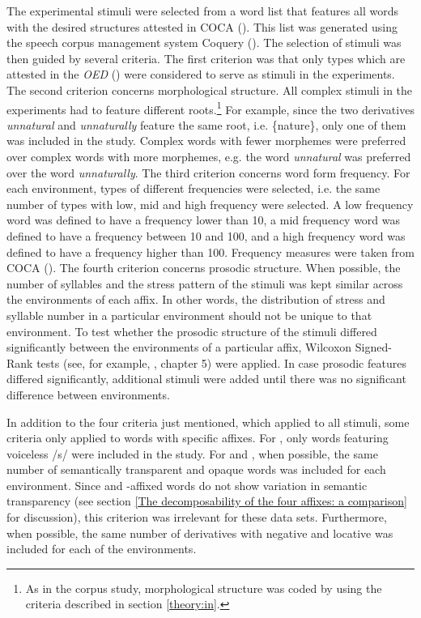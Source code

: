 The experimental stimuli were selected from a word list that features all words with the desired structures attested in COCA (\citealt{Davies.20082014}). This list was generated using the speech corpus management system Coquery (\citealt{Kunter.2016}). The selection of stimuli was then guided by several criteria. 
The first criterion was that only types which are attested in the \textit{OED} (\citealt{OED.2013}) were considered to serve as stimuli in the experiments. 
The second criterion concerns morphological structure. All complex stimuli in the experiments had to feature different roots.\footnote{As in the corpus study, morphological structure was coded by using the criteria described in section \ref{theory:in}.} For example, since the two derivatives \textit{unnatural} and \textit{unnaturally} feature the same root, i.e. \{nature\}, only one of them was included in the study. Complex words with fewer morphemes were preferred over complex words with more morphemes, e.g. the word \textit{unnatural} was preferred over the word \textit{unnaturally}. 
 The third criterion concerns word form frequency. For each environment, types of different frequencies were selected, i.e. the same number of types with low, mid and high frequency were selected. A low frequency word was defined to have a frequency lower than 10, a mid frequency word was defined to have a frequency between 10 and 100, and a high frequency word was defined to have a frequency higher than 100. Frequency measures were taken from COCA (\citealt{Davies.20082014}).
  The fourth criterion concerns prosodic structure. When possible, the number of syllables and the stress pattern of the stimuli was kept similar across the environments of each affix. In other words, the distribution of stress and syllable number in a particular environment should not be unique to that environment. To test whether the prosodic structure of the stimuli differed significantly between the environments of a particular affix, Wilcoxon Signed-Rank tests (see, for example, \citealt{Crawley.2012}, chapter 5) were applied. In case prosodic features differed significantly, additional stimuli were added until there was no significant difference between environments.
 
 In addition to the four criteria just mentioned, which applied to all stimuli, some criteria only applied to words with specific affixes. 
 For , only words featuring voiceless /s/ were included in the study. 
 For  and , when possible, the same number of semantically transparent and opaque words was included for each environment. Since  and -affixed words do not show variation in semantic transparency (see section \ref{The decomposability of the four affixes: a comparison} for discussion), this criterion was irrelevant for these data sets.
 Furthermore, when possible, the same number of derivatives with negative and locative  was included for each of the environments. 
 
